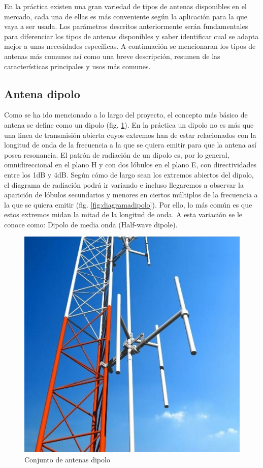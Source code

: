 \par En la práctica existen una gran variedad de tipos de antenas disponibles en el mercado, cada una de ellas es más conveniente según la aplicación para la que vaya a ser usada. Los parámetros descritos anteriormente serán fundamentales para diferenciar los tipos de antenas disponibles y saber identificar cual se adapta mejor a unas necesidades específicas. A continuación se mencionaran los tipos de antenas más comunes así como una breve descripción, resumen de las características principales y usos más comunes.

\subsection{Antena dipolo}

\par Como se ha ido mencionado a lo largo del proyecto, el concepto más básico de antena se define como un dipolo (fig. \ref{fig:conjuntodipolo}). En la práctica un dipolo no es más que una linea de transmisión abierta cuyos extremos han de estar relacionados con la longitud de onda de la frecuencia a la que se quiera emitir para que la antena así posea resonancia. El patrón de radiación de un dipolo es, por lo general, omnidireccional en el plano H y con dos lóbulos en el plano E, con directividades entre los 1dB y 4dB. Según cómo de largo sean los extremos abiertos del dipolo, el diagrama de radiación podrá ir variando e incluso llegaremos a observar la aparición de lóbulos secundarios y menores en ciertos múltiplos de la frecuencia a la que se quiera emitir (fig. \ref{fig:diagramadipolo}). Por ello, lo más común es que estos extremos midan la mitad de la longitud de onda. A esta variación se le conoce como: Dipolo de media onda (Half-wave dipole).

\begin{figure}[h]
    \centering
        \includegraphics[width=12cm]{archivos/dipolo/dipoloo}
        \caption{Conjunto de antenas dipolo}
        \label{fig:conjuntodipolo}
\end{figure}

